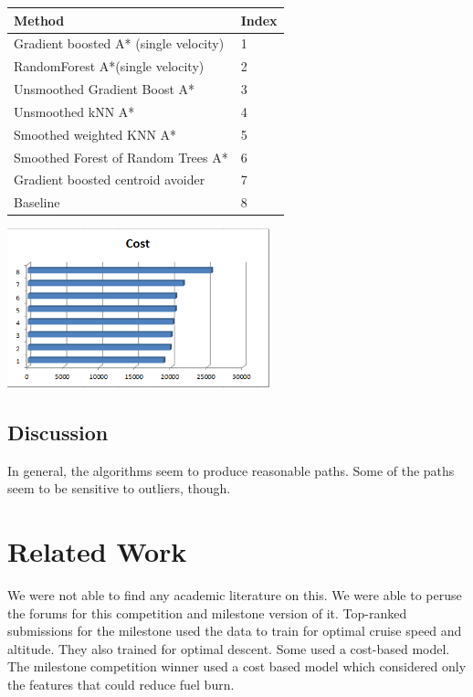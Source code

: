 \documentclass{article}[12pt]
\begin{document}
\begin{multicols}{2}
\begingroup
\noindent
\begin{tabular}{ | l | l | }
    \hline
    Method & Index \\ \hline
    Gradient boosted A* (single velocity) & 1\\ \hline
		RandomForest A*(single velocity) & 2 \\ \hline
		Unsmoothed Gradient Boost A* & 3 \\ \hline
		Unsmoothed kNN A* & 4 \\ \hline
		Smoothed weighted KNN A* & 5 \\ \hline
		Smoothed Forest of Random Trees A* & 6 \\ \hline
		Gradient boosted centroid avoider & 7\\ \hline
		Baseline & 8 \\ \hline
\end{tabular}
\begin{center}
    \includegraphics[width=3in]{results.png}
	\end{center}
\endgroup


\subsection{Discussion}
In general, the algorithms seem to produce reasonable paths. Some of the paths seem to be sensitive to outliers, though.
\section{Related Work}
We were not able to find any academic literature on this. We were able to peruse the forums for this competition and milestone version of it. Top-ranked submissions for the milestone used the data to train for optimal cruise speed and altitude. They also trained for optimal descent. Some used a cost-based model. The milestone competition winner used a cost based model which considered only the features that could reduce fuel burn. 


\end{multicols}
\end{document}

